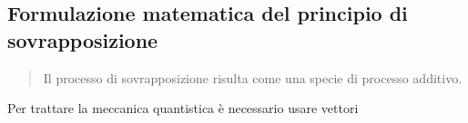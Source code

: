 \documentclass[../../../../Meccanica_quantistica]{subfiles}
\begin{document}
\subsection{
  Formulazione matematica del principio di sovrapposizione
}
  \label{
    subsec:formulazione-matematica-del-principio-di-sovrapposizione
  }
  \begin{quote}
    Il processo di sovrapposizione risulta come una specie di
    processo additivo.
  \end{quote}
  Per trattare la meccanica quantistica è necessario usare vettori
\end{document}
